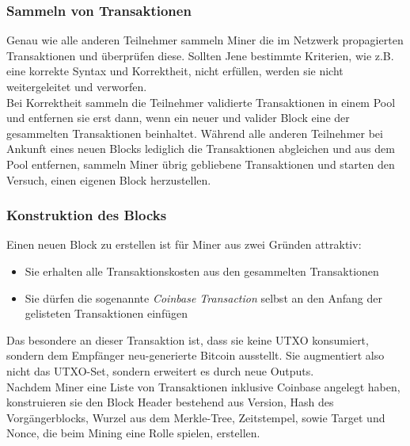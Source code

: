 \subsubsection{Sammeln von Transaktionen}
Genau wie alle anderen Teilnehmer sammeln Miner die im Netzwerk propagierten Transaktionen und überprüfen diese. Sollten Jene bestimmte Kriterien, wie z.B. eine korrekte Syntax und Korrektheit, nicht erfüllen, werden sie nicht weitergeleitet und verworfen.\\
Bei Korrektheit sammeln die Teilnehmer validierte Transaktionen in einem Pool und entfernen sie erst dann, wenn ein neuer und valider Block eine der gesammelten Transaktionen beinhaltet. 
Während alle anderen Teilnehmer bei Ankunft eines neuen Blocks lediglich die Transaktionen abgleichen und aus dem Pool entfernen, sammeln Miner übrig gebliebene Transaktionen und starten den Versuch, einen eigenen Block herzustellen.
\subsubsection{Konstruktion des Blocks}
Einen neuen Block zu erstellen ist für Miner aus zwei Gründen attraktiv:
\begin{itemize}
\item Sie erhalten alle Transaktionskosten aus den gesammelten Transaktionen
\item Sie dürfen die sogenannte \emph{Coinbase Transaction} selbst an den Anfang der gelisteten Transaktionen einfügen
\end{itemize}
Das besondere an dieser Transaktion ist, dass sie keine UTXO konsumiert, sondern dem Empfänger neu-generierte Bitcoin ausstellt. Sie augmentiert also nicht das UTXO-Set, sondern erweitert es durch neue Outputs.\\ 
Nachdem Miner eine Liste von Transaktionen inklusive Coinbase angelegt haben, konstruieren sie den Block Header bestehend aus Version, Hash des Vorgängerblocks, Wurzel aus dem Merkle-Tree, Zeitstempel, sowie Target und Nonce, die beim Mining eine Rolle spielen, erstellen.
